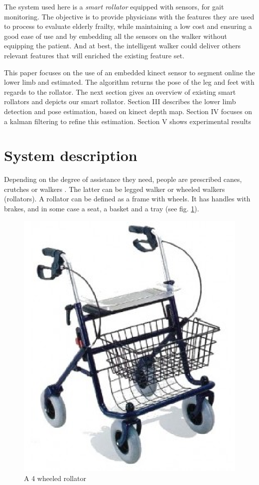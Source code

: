 \documentclass[letterpaper, 10 pt, conference]{ieeeconf}
\newcommand{\CDOK}[2]{{#1}} %
\begin{document}
The system used here is a \textit{smart rollator} equipped with sensors, for gait monitoring. The objective is to provide physicians with the features they are used to process to evaluate elderly frailty,  while maintaining a low cost  and ensuring a good ease of use and by embedding all the sensors on the walker without equipping the patient. And at best, the intelligent walker could deliver others relevant features that will enriched the existing feature set. 

\CDOK{This paper focuses on the use of an embedded kinect sensor to segment online the lower limb and estimated. The algorithm returns the pose of the leg and feet with regards to the rollator. The next section gives an overview of existing smart rollators and depicts our smart rollator. Section III describes the lower limb detection and pose estimation, based on kinect depth map. Section IV focuses on a kalman filtering to refine this estimation. Section V shows experimental results  }{}

\section{System description}

Depending on the degree of assistance they need, people are prescribed canes, crutches or walkers \cite{Joyce91}. The latter can be legged walker or wheeled walkers (rollators). A rollator can be defined as a frame with wheels. It has handles with brakes, and in some case a seat, a basket and a tray (see fig. \ref{fig:rollator}).

\begin{figure}[h]
	\centering
	\includegraphics[width=0.45\columnwidth]{images/rollator.eps}
	\caption{A 4 wheeled rollator}
	\label{fig:rollator}
\end{figure}
\end{document}
